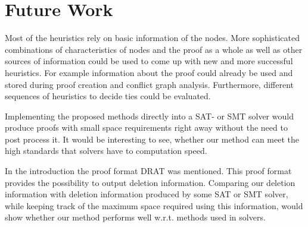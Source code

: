 \section{Future Work}
\label{sec:pebblingfuturework}

Most of the heuristics rely on basic information of the nodes.
More sophisticated combinations of characteristics of nodes and the proof as a whole as well as other sources of information could be used to come up with new and more successful heuristics.
For example information about the proof could already be used and stored during proof creation and conflict graph analysis.
Furthermore, different sequences of heuristics to decide ties could be evaluated.

Implementing the proposed methods directly into a SAT- or SMT solver would produce proofs with small space requirements right away without the need to post process it.
It would be interesting to see, whether our method can meet the high standards that solvers have to computation speed.

In the introduction the proof format DRAT was mentioned.
This proof format provides the possibility to output deletion information.
Comparing our deletion information with deletion information produced by some SAT or SMT solver, while keeping track of the maximum space required using this information, would show whether our method performs well w.r.t. methods used in solvers.